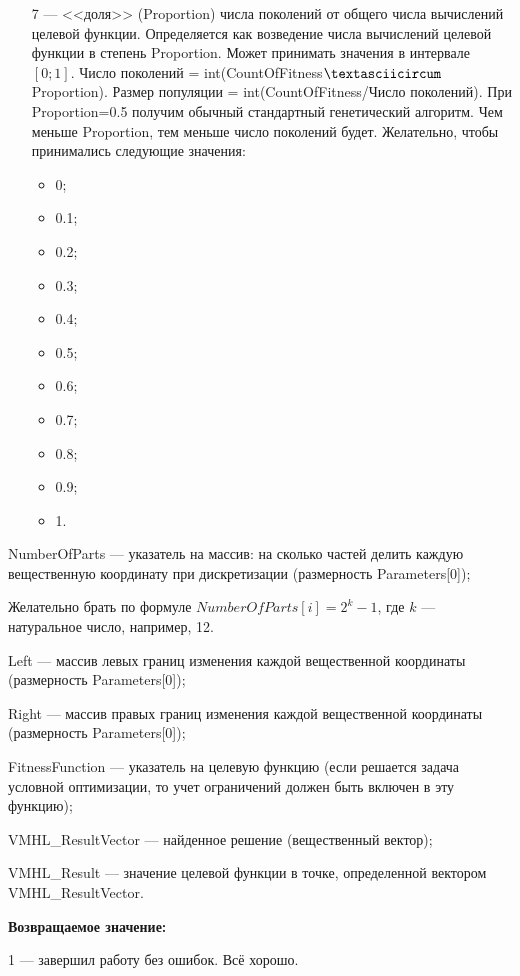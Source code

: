 \documentclass[a4paper,12pt]{article}
\begin{document}
\begin{itemize}
 \item [7] --- <<доля>> (Proportion) числа поколений от общего числа вычислений целевой функции. Определяется как возведение числа вычислений целевой функции в степень Proportion. Может принимать значения в интервале $[0;1]$. Число поколений = int(CountOfFitness$\textasciicircum$Proportion). Размер популяции = int(CountOfFitness/Число поколений). При Proportion=0.5 получим обычный стандартный генетический алгоритм. Чем меньше Proportion, тем меньше число поколений будет. Желательно, чтобы принимались следующие значения:
  \begin{itemize}
       \item 0;
	   \item 0.1;
	   \item 0.2;
	   \item 0.3;
	   \item 0.4;
	   \item 0.5;
	   \item 0.6;
	   \item 0.7;
	   \item 0.8;
	   \item 0.9; 
       \item 1.
	    \end{itemize}
 \end{itemize}
 
 NumberOfParts --- указатель на массив: на сколько частей делить каждую вещественную координату при дискретизации (размерность Parameters[0]);
 
  Желательно брать по формуле $NumberOfParts[i]=2^k-1$, где $k$ --- натуральное число, например, 12.
  
 Left --- массив левых границ изменения каждой вещественной координаты (размерность Parameters[0]);
 
 Right --- массив правых границ изменения каждой вещественной координаты (размерность Parameters[0]);
 
 FitnessFunction --- указатель на целевую функцию (если решается задача условной оптимизации, то учет ограничений должен быть включен в эту функцию);
 
 VMHL\_ResultVector --- найденное решение (вещественный вектор);
 
 VMHL\_Result --- значение целевой функции в точке, определенной вектором VMHL\_ResultVector.

\textbf{Возвращаемое значение:} 

 1 --- завершил работу без ошибок. Всё хорошо.
 
\end{document}
